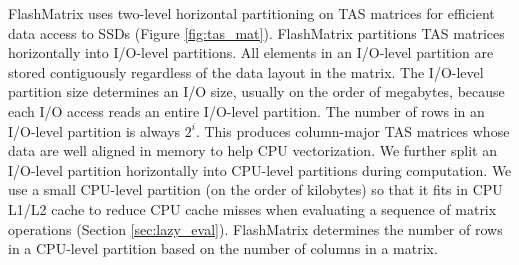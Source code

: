 FlashMatrix uses two-level horizontal partitioning on TAS matrices for
efficient data access to SSDs (Figure \ref{fig:tas_mat}).
FlashMatrix partitions TAS matrices horizontally into I/O-level partitions.
All elements in an I/O-level partition are stored contiguously regardless
of the data layout in the matrix. The I/O-level partition
size determines an I/O size, usually on the order of megabytes, because each
I/O access reads an entire I/O-level partition. The number of rows in
an I/O-level partition is always $2^i$. This produces column-major TAS
matrices whose data are well aligned in memory to help CPU vectorization.
We further split an I/O-level partition horizontally into CPU-level partitions
during computation. We use a small
CPU-level partition (on the order of kilobytes) so that it fits in CPU
L1/L2 cache to reduce CPU cache misses when evaluating a sequence of matrix
operations (Section \ref{sec:lazy_eval}). FlashMatrix determines the number
of rows in a CPU-level partition based on the number of columns in a matrix.


